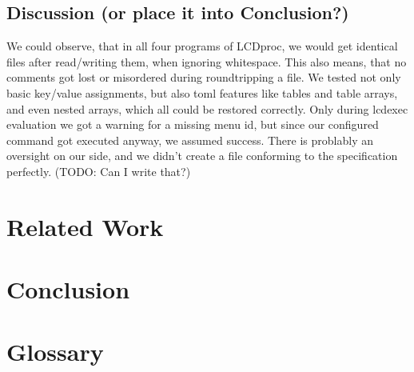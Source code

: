 \documentclass[12pt]{report}
\begin{document}
\section{Discussion (or place it into Conclusion?)}
We could observe, that in all four programs of LCDproc, we would get identical files after read/writing them, when ignoring whitespace.
This also means, that no comments got lost or misordered during roundtripping a file.
We tested not only basic key/value assignments, but also \acrshort{toml} features like tables and table arrays, and even nested arrays, which all could be restored correctly.
Only during lcdexec evaluation we got a warning for a missing menu id, but since our configured command got executed anyway, we assumed success.
There is problably an oversight on our side, and we didn't create a file conforming to the specification perfectly. (TODO: Can I write that?)

\chapter{Related Work}

\chapter{Conclusion}

\chapter{Glossary}

\printglossary[type=\acronymtype]

{}

\end{document}
